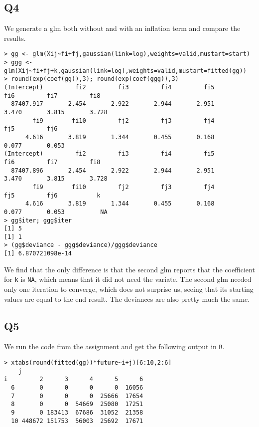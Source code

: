 \documentclass[11pt]{article}
\begin{document}
\subsection*{Q4}

We generate a glm both without and with an inflation term and compare the results.

\begin{verbatim}
> gg <- glm(Xij~fi+fj,gaussian(link=log),weights=valid,mustart=start)
> ggg <- glm(Xij~fi+fj+k,gaussian(link=log),weights=valid,mustart=fitted(gg))
> round(exp(coef(gg)),3); round(exp(coef(ggg)),3)
(Intercept)         fi2         fi3         fi4         fi5         fi6         fi7         fi8 
  87407.917       2.454       2.922       2.944       2.951       3.470       3.815       3.728 
        fi9        fi10         fj2         fj3         fj4         fj5         fj6 
      4.616       3.819       1.344       0.455       0.168       0.077       0.053 
(Intercept)         fi2         fi3         fi4         fi5         fi6         fi7         fi8 
  87407.896       2.454       2.922       2.944       2.951       3.470       3.815       3.728 
        fi9        fi10         fj2         fj3         fj4         fj5         fj6           k 
      4.616       3.819       1.344       0.455       0.168       0.077       0.053          NA 
> gg$iter; ggg$iter
[1] 5
[1] 1
> (gg$deviance - ggg$deviance)/ggg$deviance
[1] 6.870721098e-14
\end{verbatim}

We find that the only difference is that the second glm reports that the coefficient for \verb|k| is \verb|NA|, which means that it did not need the variate. The second glm needed only one iteration to converge, which does not surprise us, seeing that its starting values are equal to the end result. The deviances are also pretty much the same. 

\subsection*{Q5}

We run the code from the assignment and get the following output in \verb|R|.

\begin{verbatim}
> xtabs(round(fitted(gg))*future~i+j)[6:10,2:6]
    j
i         2      3      4      5      6
  6       0      0      0      0  16056
  7       0      0      0  25666  17654
  8       0      0  54669  25080  17251
  9       0 183413  67686  31052  21358
  10 448672 151753  56003  25692  17671
\end{verbatim}
\end{document}
